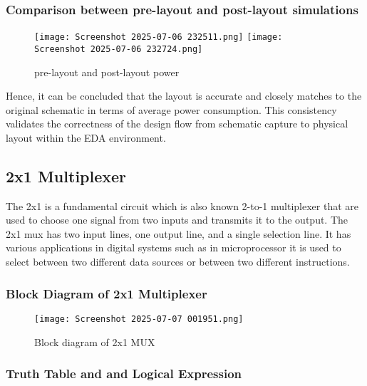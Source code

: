\documentclass[12pt]{article}
\begin{document}
    \subsubsection{Comparison between pre-layout and post-layout simulations}
     \begin{figure}[H]
         \centering
         \texttt{[image: Screenshot 2025-07-06 232511.png]}
         \texttt{[image: Screenshot 2025-07-06 232724.png]}
         \caption{pre-layout and post-layout power}
         \label{fig:enter-label}
     \end{figure}
      Hence, it can be concluded that the layout is accurate and closely matches to the original schematic in terms of average power consumption. This consistency validates the correctness of the design flow from schematic capture to physical layout within the EDA environment.


    \subsection{\large{\textbf{2x1 Multiplexer}}}

    The 2x1 is a fundamental circuit which is also known 2-to-1 multiplexer that are used to choose one signal from two inputs and transmits it to the output. The 2x1 mux has two input lines, one output line, and a single selection line. It has various applications in digital systems such as in microprocessor it is used to select between two different data sources or between two different instructions.
    \subsubsection{Block Diagram of 2x1 Multiplexer}
    \begin{figure}[H]
        \centering
        \texttt{[image: Screenshot 2025-07-07 001951.png]}
        \caption{Block diagram of 2x1 MUX}
        \label{fig:enter-label}
    \end{figure}
     
    
    \subsubsection{Truth Table and and Logical Expression}
       
\end{document}
